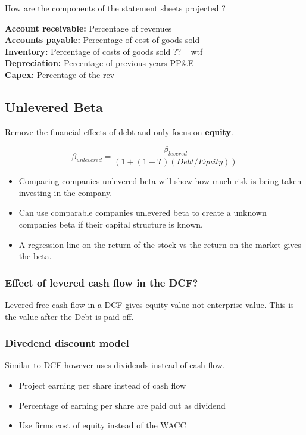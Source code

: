 \documentclass[11pt]{scrartcl} %
\begin{document}
How are the components of the statement sheets projected ?

\textbf{Account receivable:} Percentage of revenues\\
\textbf{Accounts payable:} Percentage of cost of goods sold \\
\textbf{Inventory:} Percentage of costs of goods sold ?? ~ wtf \\
\textbf{Depreciation:} Percentage of previous years PP\&E \\
\textbf{Capex:} Percentage of the rev

\subsection{Unlevered Beta}

Remove the financial effects of debt and only focus on \textbf{equity}.

\[ \beta_{unlevered} = \frac{\beta_{levered}}{(1 + (1-T)(Debt/Equity))} \]

\begin{itemize}
	\item Comparing companies unlevered beta will show how much risk is being taken investing in the company.
	\item Can use comparable companies unlevered beta to create a unknown companies beta if their capital structure is known.
	\item A regression line on the return of the stock vs the return on the market gives the beta.
\end{itemize}

\subsubsection{Effect of levered cash flow in the DCF?}

Levered free cash flow in a DCF gives equity value not enterprise value. This is the value after the Debt is paid off.

\subsubsection{Divedend discount model}

Similar to DCF however uses dividends instead of cash flow.

\begin{itemize}
	\item Project earning per share instead of cash flow
	\item Percentage of earning per share are paid out as dividend
	\item Use firms cost of equity instead of the WACC
\end{itemize}
\end{document}
